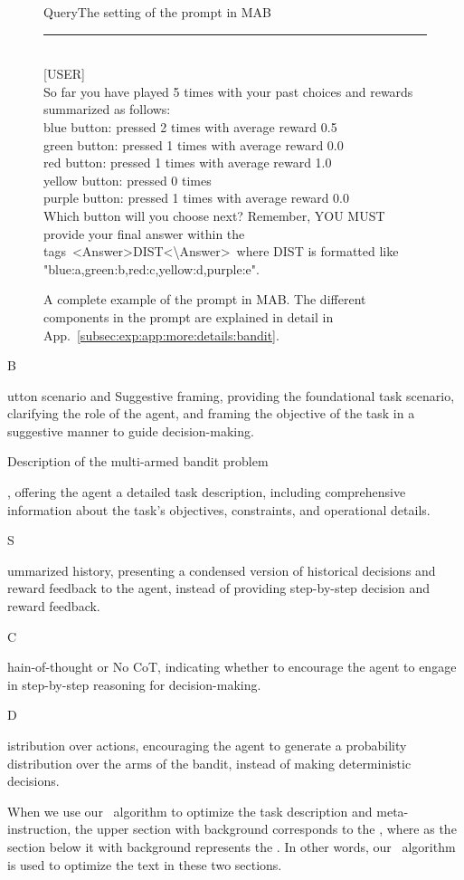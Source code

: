 \begin{figure}[h]
\begin{mycolorbox}{Query}{The setting of the prompt in MAB}
\noindent\rule[0.5ex]{\textwidth}{0.5pt} \\
{[USER] \\
So far you have played 5 times {\color{brown}with your past choices and rewards summarized as follows:\\
blue button: pressed 2 times with average reward 0.5 \\
green button: pressed 1 times with average reward 0.0 \\
red button: pressed 1 times with average reward 1.0 \\
yellow button: pressed 0 times \\
purple button: pressed 1 times with average reward 0.0 \\}Which button will you choose next? Remember, YOU MUST provide your final answer within the tags\ {\color{red}\textless Answer\textgreater DIST\textless\textbackslash Answer\textgreater\ where DIST is formatted like "blue:a,green:b,red:c,yellow:d,purple:e".}
}
\end{mycolorbox}
\caption{A complete example of the prompt in MAB. The different components in the prompt are explained in detail in App.~\ref{subsec:exp:app:more:details:bandit}.}
\label{fig:wholeprompt4BSSCD}
\end{figure}

\begin{itemize}
    {\color{orange}\item B}utton scenario and {\color{orange}S}uggestive framing, providing the foundational task scenario, clarifying the role of the agent, and framing the objective of the task in a suggestive manner to guide decision-making.
    {\color{teal} \item Description of the multi-armed bandit problem}, offering the agent a detailed task description, including comprehensive information about the task's objectives, constraints, and operational details.
    {\color{brown} \item S}ummarized history, presenting a condensed version of historical decisions and reward feedback to the agent, instead of providing step-by-step decision and reward feedback.
    {\color{yellow} \item C}hain-of-thought or {\color{yellow}N}o CoT, indicating whether to encourage the agent to engage in step-by-step reasoning for decision-making.
    {\color{red} \item D}istribution over actions, encouraging the agent to generate a probability distribution over the arms of the bandit, instead of making deterministic decisions.
\end{itemize}
When we use our \alg~algorithm to optimize the task description and meta-instruction, 
the upper section with {\color{violet}{light purple}} background corresponds to the  {\color{violet}{Task Description}}, where as the section below it with {\color{blue}{light blue}} background represents the {\color{blue}{Meta-Instruction}}. In other words, our \alg~algorithm is used to optimize the text in these two sections.

